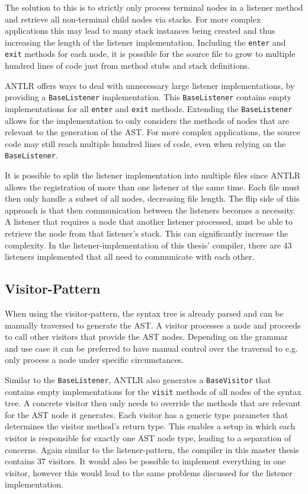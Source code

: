 The solution to this is to strictly only process terminal nodes in a listener method and retrieve all non-terminal child nodes via stacks. For more complex applications this may lead to many stack instances being created and thus increasing the length of the listener implementation. Including the \verb|enter| and \verb|exit| methods for each node, it is possible for the source file to grow to multiple hundred lines of code just from method stubs and stack definitions. 

ANTLR offers ways to deal with unnecessary large listener implementations, by providing a \verb|BaseListener| implementation. This \verb|BaseListener| contains empty implementations for all \verb|enter| and \verb|exit| methods. 
Extending the \verb|BaseListener| allows for the implementation to only considers the methods of nodes that are relevant to the generation of the AST. For more complex applications, the source code may still reach multiple hundred lines of code, even when relying on the \verb|BaseListener|. 

It is possible to split the listener implementation into multiple files since ANTLR allows the registration of more than one listener at the same time. Each file must then only handle a subset of all nodes, decreasing file length. The flip side of this approach is that then communication between the listeners becomes a necessity. A listener that requires a node that another listener processed, must be able to retrieve the node from that listener's stack. This can significantly increase the complexity. In the listener-implementation of this thesis' compiler, there are 43 listeners implemented that all need to communicate with each other. 


\subsection{Visitor-Pattern}

When using the visitor-pattern, the syntax tree is already parsed and can be manually traversed to generate the AST. A visitor processes a node and proceeds to call other visitors that provide the AST nodes. Depending on the grammar and use case it can be preferred to have manual control over the traversal to e.g. only process a node under specific circumstances.  

Similar to the \verb|BaseListener|, ANTLR also generates a \verb|BaseVisitor| that contains empty implementations for the \verb|visit| methods of all nodes of the syntax tree. A concrete visitor then only needs to override the methods that are relevant for the AST node it generates. Each visitor has a generic type parameter that determines the visitor method's return type. This enables a setup in which each visitor is responsible for exactly one AST node type, leading to a separation of concerns. Again similar to the listener-pattern, the compiler in this master thesis contains 37 visitors. It would also be possible to implement everything in one visitor, however this would lead to the same problems discussed for the listener implementation.  

